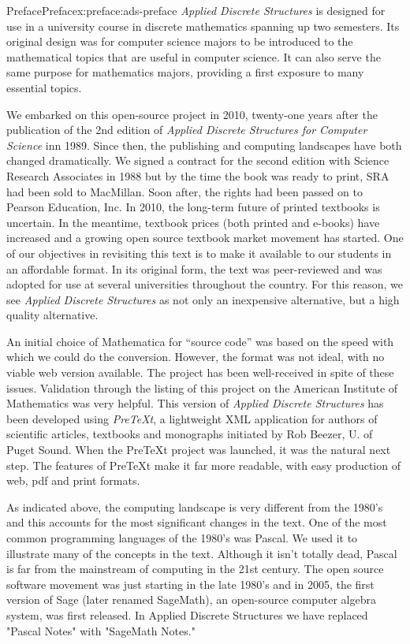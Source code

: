 \documentclass[oneside,10pt,]{book}
\begin{document}
\begin{preface}{Preface}{}{Preface}{}{}{x:preface:ads-preface}
\emph{Applied Discrete Structures} is designed for use in a university course in discrete mathematics spanning up two semesters.   Its original design was for computer science majors to be introduced to the mathematical topics that are useful in computer science.   It can also serve the same purpose for mathematics majors, providing a first exposure to many essential topics.%
\par
We embarked on this open-source project in 2010, twenty-one years after the publication of the 2nd edition of \emph{Applied Discrete Structures for Computer Science} inn 1989.  Since then, the publishing and computing landscapes have both changed dramatically. We signed a contract for the second edition with Science Research Associates in 1988 but by the time the book was ready to print, SRA had been sold to MacMillan. Soon after, the rights had been passed on to Pearson Education, Inc. In 2010, the long-term future of printed textbooks is uncertain. In the meantime, textbook prices (both printed and e-books) have increased and a growing open source textbook market movement has started. One of our objectives in revisiting this text is to make it available to our students in an affordable format. In its original form, the text was peer-reviewed and was adopted for use at several universities throughout the country. For this reason, we see \emph{Applied Discrete Structures} as not only an inexpensive alternative, but a high quality alternative.%
\par
An initial choice of Mathematica for ``source code'' was based on the speed with which we could do the conversion.  However, the format was not ideal, with no viable web version available.  The project has been well-received in spite of these issues.  Validation through the listing of this project on the American Institute of Mathematics was very helpful. This version of \emph{Applied Discrete Structures} has been developed using \emph{PreTeXt}, a lightweight XML application for authors of scientific articles, textbooks and monographs initiated by Rob Beezer, U. of Puget Sound.  When the PreTeXt project was launched, it was the natural next step.  The features of PreTeXt make it far more readable, with easy production of web, pdf and print formats.%
\par
As indicated above, the computing landscape is very different from the 1980's and this accounts for the most significant changes in the text. One of the most common programming languages of the 1980's was Pascal.  We used it to illustrate many of the concepts in the text.  Although it isn't totally dead, Pascal is far from the mainstream of computing in the 21st century.  The open source software movement was just starting in the late 1980's and in 2005, the first version of Sage (later renamed SageMath), an open-source computer algebra system, was first released. In Applied Discrete Structures we have replaced "Pascal Notes" with "SageMath Notes."%

\end{preface}
\end{document}
